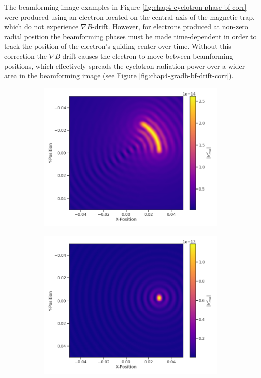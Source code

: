 The beamforming image examples in Figure \ref{fig:chap4-cyclotron-phase-bf-corr} were produced using an electron located on the central axis of the magnetic trap, which do not experience $\nabla B$-drift. However, for electrons produced at non-zero radial position the beamforming phases must be made time-dependent in order to track the position of the electron's guiding center over time. Without this correction the $\nabla B$-drift causes the electron to move between beamforming positions, which effectively spreads the cyclotron radiation power over a wider area in the beamforming image (see Figure \ref{fig:chap4-gradb-bf-drift-corr}).
\begin{figure}[htbp]
    \centering
    \begin{subfigure}{0.45\textwidth}
        \includegraphics[width=\textwidth]{figs/Chapter-4/220318_88deg_electron_3cm_no_correction.png}
        \caption{}
    \end{subfigure}
    \hfill
    \begin{subfigure}{0.45\textwidth}
        \includegraphics[width=\textwidth]{figs/Chapter-4/220318_88deg_electron_3cm_corrected.png}

\end{subfigure}
\end{figure}
